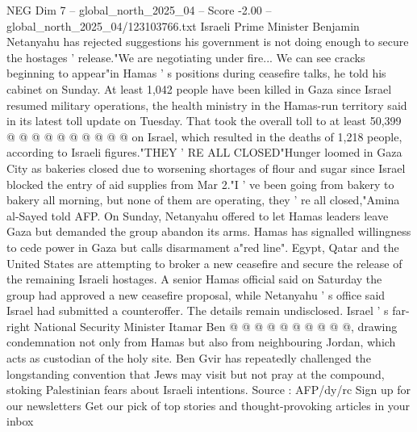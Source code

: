 \begin{textsample}{NEG Dim 7 – global\_north\_2025\_04 – Score -2.00 – global\_north\_2025\_04/123103766.txt}
Israeli Prime Minister Benjamin Netanyahu has rejected suggestions his government is not doing enough to secure the hostages ' release."We are negotiating under fire...
We can see cracks beginning to appear"in Hamas ' s positions during ceasefire talks, he told his cabinet on Sunday.
At least 1,042 people have been killed in Gaza since Israel resumed military operations, the health ministry in the Hamas-run territory said in its latest toll update on Tuesday.
That took the overall toll to at least 50,399 @ @ @ @ @ @ @ @ @ @ on Israel, which resulted in the deaths of 1,218 people, according to Israeli figures."THEY ' RE ALL CLOSED"Hunger loomed in Gaza City as bakeries closed due to worsening shortages of flour and sugar since Israel blocked the entry of aid supplies from Mar 2."I ' ve been going from bakery to bakery all morning, but none of them are operating, they ' re all closed,"Amina al-Sayed told AFP.
On Sunday, Netanyahu offered to let Hamas leaders leave Gaza but demanded the group abandon its arms.
Hamas has signalled willingness to cede power in Gaza but calls disarmament a"red line".
Egypt, Qatar and the United States are attempting to broker a new ceasefire and secure the release of the remaining Israeli hostages.
A senior Hamas official said on Saturday the group had approved a new ceasefire proposal, while Netanyahu ' s office said Israel had submitted a counteroffer.
The details remain undisclosed.
Israel ' s far-right National Security Minister Itamar Ben @ @ @ @ @ @ @ @ @ @, drawing condemnation not only from Hamas but also from neighbouring Jordan, which acts as custodian of the holy site.
Ben Gvir has repeatedly challenged the longstanding convention that Jews may visit but not pray at the compound, stoking Palestinian fears about Israeli intentions.
Source : AFP/dy/rc Sign up for our newsletters Get our pick of top stories and thought-provoking articles in your inbox

\end{textsample}
